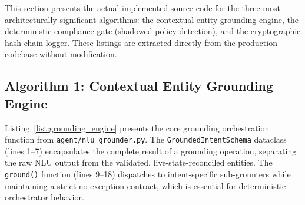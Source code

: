 This section presents the actual implemented source code for the three most architecturally significant algorithms: the contextual entity grounding engine, the deterministic compliance gate (shadowed policy detection), and the cryptographic hash chain logger. These listings are extracted directly from the production codebase without modification.

\subsection{Algorithm 1: Contextual Entity Grounding Engine}
\label{subsec:list_grounding}

Listing~\ref{list:grounding_engine} presents the core grounding orchestration function from \texttt{agent/nlu\_grounder.py}. The \texttt{GroundedIntentSchema} dataclass (lines 1--7) encapsulates the complete result of a grounding operation, separating the raw NLU output from the validated, live-state-reconciled entities. The \texttt{ground()} function (lines 9--18) dispatches to intent-specific sub-grounters while maintaining a strict no-exception contract, which is essential for deterministic orchestrator behavior.

